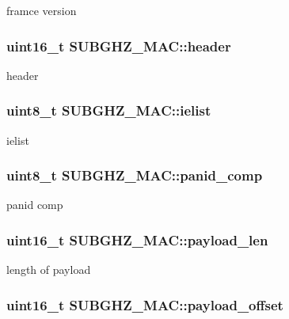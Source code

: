 framce version \hypertarget{structSUBGHZ__MAC_a2d57436faa7bbce52ce2eb58558f04d5}{
\subsubsection[{header}]{\setlength{\rightskip}{0pt plus 5cm}uint16\+\_\+t S\+U\+B\+G\+H\+Z\+\_\+\+M\+A\+C\+::header}}\label{structSUBGHZ__MAC_a2d57436faa7bbce52ce2eb58558f04d5}
header \hypertarget{structSUBGHZ__MAC_ab792da2ce9ee262c239d3a52843b6053}{
\subsubsection[{ielist}]{\setlength{\rightskip}{0pt plus 5cm}uint8\+\_\+t S\+U\+B\+G\+H\+Z\+\_\+\+M\+A\+C\+::ielist}}\label{structSUBGHZ__MAC_ab792da2ce9ee262c239d3a52843b6053}
ielist \hypertarget{structSUBGHZ__MAC_ab2922bd6d5517e29c69bed9b076dbecf}{
\subsubsection[{panid\+\_\+comp}]{\setlength{\rightskip}{0pt plus 5cm}uint8\+\_\+t S\+U\+B\+G\+H\+Z\+\_\+\+M\+A\+C\+::panid\+\_\+comp}}\label{structSUBGHZ__MAC_ab2922bd6d5517e29c69bed9b076dbecf}
panid comp \hypertarget{structSUBGHZ__MAC_a549d1e13fec06ec689c51094ba364318}{
\subsubsection[{payload\+\_\+len}]{\setlength{\rightskip}{0pt plus 5cm}uint16\+\_\+t S\+U\+B\+G\+H\+Z\+\_\+\+M\+A\+C\+::payload\+\_\+len}}\label{structSUBGHZ__MAC_a549d1e13fec06ec689c51094ba364318}
length of payload \hypertarget{structSUBGHZ__MAC_a513211bfc7443a599fe9fbc5a9b1f381}{
\subsubsection[{payload\+\_\+offset}]{\setlength{\rightskip}{0pt plus 5cm}uint16\+\_\+t S\+U\+B\+G\+H\+Z\+\_\+\+M\+A\+C\+::payload\+\_\+offset}}\label{structSUBGHZ__MAC_a513211bfc7443a599fe9fbc5a9b1f381}
